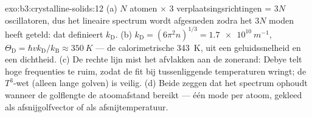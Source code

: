 \begin{solution}{exo:b3:crystalline-solids:12}
(a) $N$ atomen $\times$ 3 verplaatsingsrichtingen = $3N$
oscillatoren, dus het lineaire spectrum wordt afgesneden zodra het
$3N$ moden heeft geteld: dat definieert $k_{\text{D}}$. (b)
$k_{\text{D}} = (6\pi^2n)^{1/3} = \qty{1.7e10}{m^{-1}}$,
$\Theta_{\text{D}} = \hbar vk_{\text{D}}/k_{\text{B}} \approx
\qty{350}{K}$ --- de calorimetrische \qty{343}{K}, uit een
geluidssnelheid en een dichtheid. (c) De rechte lijn mist het afvlakken
aan de zonerand: Debye telt hoge frequenties te ruim, zodat de fit
bij tussenliggende temperaturen wringt; de $T^3$-wet (alleen lange golven)
is veilig. (d) Beide zeggen dat het spectrum ophoudt wanneer de golflengte
de atoomafstand bereikt --- één mode per atoom, gekleed als
afsnijgolfvector of als afsnijtemperatuur.
\end{solution}

